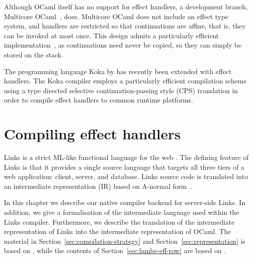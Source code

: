 \documentclass[12pt,mscres,cdtppar,twoside,openright,logo,rightchapter,normalheadings]{infthesis}
\theoremstyle{definition}
\newcommand{\todo}[1]{{\par\noindent\small\color{red} \framebox{\parbox{\dimexpr\linewidth-2\fboxsep-2\fboxrule}{\textbf{TODO:} #1}}}}
\begin{document}
Although OCaml itself has no support for effect handlers, a
development branch, Multicore OCaml~\citep{Dolan2015}, does. Multicore
OCaml does not include an effect type system, and handlers are
restricted so that continuations are affine, that is, they can be
invoked at most once. This design admits a particularly efficient
implementation~\citep{Bruggeman1996}, as continuations need never be
copied, so they can simply be stored on the stack.

The programming language Koka by \citet{Leijen2016} has recently
been extended with effect handlers. The Koka compiler employs a
particularly efficient compilation scheme using a type directed
selective continuation-passing style (CPS) translation in order to
compile effect handlers to common runtime platforms.





\chapter{Compiling effect handlers}
\label{ch:compiling}

Links is a strict ML-like functional language for the web
\citep{Cooper2006}. The defining feature of Links is that it provides
a single source language that targets all three tiers of a web
application: client, server, and database. Links source code is
translated into an intermediate representation (IR) based on A-normal
form~\citep{Flanagan1993}.

In this chapter we describe our native compiler backend for
server-side Links. In addition, we give a formalisation of the
intermediate language used within the Links compiler. Furthermore, we
describe the translation of the intermediate representation of Links
into the intermediate representation of OCaml. The material in
Section~\ref{sec:compilation-strategy} and
Section~\ref{sec:representation} is based on \cite{Hillerstrom2016b},
while the contents of Section~\ref{sec:lambe-eff-row} are based on
\cite{Hillerstrom2016a}.
\end{document}
